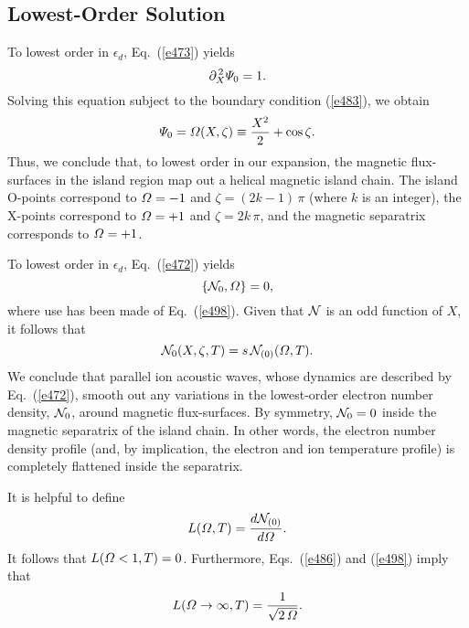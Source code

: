 \documentclass[12pt,prb,aps]{revtex4-1}
\begin{document}
\subsection{Lowest-Order Solution}
To lowest order in $\epsilon_d$, Eq.~(\ref{e473}) yields
\begin{equation}
\partial_X^{\,2}{\mit\Psi}_0 = 1.
\end{equation} 
Solving this equation subject to the boundary condition (\ref{e483}), we obtain
\begin{equation}\label{e498}
{\mit\Psi}_0 = {\mit\Omega}(X,\zeta)\equiv \frac{X^2}{2} + \cos\zeta.
\end{equation}
Thus, we conclude that, to lowest order in our expansion, the magnetic flux-surfaces in the island region map out a helical magnetic island
chain. The island O-points correspond to ${\mit\Omega}=-1$ and $\zeta=(2k-1)\,\pi$ (where $k$ is an integer), the
X-points correspond to ${\mit\Omega}=+1$ and $\zeta = 2k\,\pi$, and the magnetic separatrix corresponds to 
${\mit\Omega}=+1$. 

To lowest order in $\epsilon_d$, Eq.~(\ref{e472}) yields
\begin{equation}
\{{\cal N}_0, {\mit\Omega}\}= 0,
\end{equation}
where use has been made of Eq.~(\ref{e498}). Given that ${\cal N}$ is an odd function of $X$, it
follows that
\begin{equation}\label{e500}
{\cal N}_0(X,\zeta,T) = s\, {\cal N}_{(0)}({\mit\Omega},T).
\end{equation}
We conclude that parallel
ion acoustic waves, whose dynamics are described by Eq.~(\ref{e472}),  smooth  out
any variations in the lowest-order electron number density, ${\cal N}_0$,  around magnetic flux-surfaces. 
By symmetry, ${\cal N}_{0}=0$ inside the magnetic separatrix of the island chain. In other words, the electron number
density profile (and, by implication, the electron and ion temperature profile) is completely flattened inside 
the  separatrix. 

It is helpful to define
\begin{equation}\label{e501}
L({\mit\Omega},T) = \frac{d{\cal N}_{(0)}}{d{\mit\Omega}}.
\end{equation}
It follows that $L({\mit\Omega}<1,T)=0$. Furthermore, Eqs.~(\ref{e486}) and (\ref{e498}) imply that
\begin{equation}\label{e502}
L({\mit\Omega}\rightarrow\infty,T) = \frac{1}{\sqrt{2\,{\mit\Omega}}}.
\end{equation}
\end{document}
